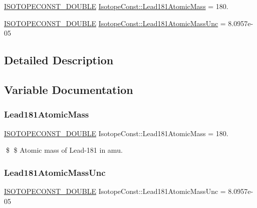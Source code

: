 \begin{DoxyCompactItemize}
\item 
\mbox{\hyperlink{group___isotope_const-_macros_ga8f45a7272ce02c0b4c65c44636ed719a}{I\+S\+O\+T\+O\+P\+E\+C\+O\+N\+S\+T\+\_\+\+D\+O\+U\+B\+LE}} \mbox{\hyperlink{group___isotope_const-_lead-_pb181_ga6a768e93af3661550233e2509ca80080}{Isotope\+Const\+::\+Lead181\+Atomic\+Mass}} = 180.
\item 
\mbox{\hyperlink{group___isotope_const-_macros_ga8f45a7272ce02c0b4c65c44636ed719a}{I\+S\+O\+T\+O\+P\+E\+C\+O\+N\+S\+T\+\_\+\+D\+O\+U\+B\+LE}} \mbox{\hyperlink{group___isotope_const-_lead-_pb181_ga34df094c514e3e41110fa4a827298e91}{Isotope\+Const\+::\+Lead181\+Atomic\+Mass\+Unc}} = 8.\+0957e-\/05
\end{DoxyCompactItemize}


\subsection{Detailed Description}


\subsection{Variable Documentation}
\mbox{\label{group___isotope_const-_lead-_pb181_ga6a768e93af3661550233e2509ca80080}} 
\subsubsection{\texorpdfstring{Lead181\+Atomic\+Mass}{Lead181AtomicMass}}
{\footnotesize\ttfamily \mbox{\hyperlink{group___isotope_const-_macros_ga8f45a7272ce02c0b4c65c44636ed719a}{I\+S\+O\+T\+O\+P\+E\+C\+O\+N\+S\+T\+\_\+\+D\+O\+U\+B\+LE}} Isotope\+Const\+::\+Lead181\+Atomic\+Mass = 180.}

\$ \$ Atomic mass of Lead-\/181 in amu. \mbox{\label{group___isotope_const-_lead-_pb181_ga34df094c514e3e41110fa4a827298e91}} 
\subsubsection{\texorpdfstring{Lead181\+Atomic\+Mass\+Unc}{Lead181AtomicMassUnc}}
{\footnotesize\ttfamily \mbox{\hyperlink{group___isotope_const-_macros_ga8f45a7272ce02c0b4c65c44636ed719a}{I\+S\+O\+T\+O\+P\+E\+C\+O\+N\+S\+T\+\_\+\+D\+O\+U\+B\+LE}} Isotope\+Const\+::\+Lead181\+Atomic\+Mass\+Unc = 8.\+0957e-\/05}

